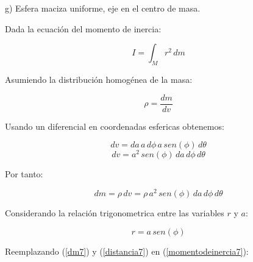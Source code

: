 \documentclass[letter,11pt]{article}
\begin{document}
\newpage
g) Esfera maciza uniforme, eje en el centro de masa.

Dada la ecuación del momento de inercia:

\begin{equation}
    I = \int_{M} r^2\, dm
\label{momentodeinercia7}
\end{equation}

Asumiendo la distribución homogénea de la masa:

\begin{equation*}
    \rho = \frac{dm}{dv}
\end{equation*}

Usando un diferencial en coordenadas esfericas obtenemos:

\begin{equation*}
    dv = da\, a\, d\phi\, a\, sen (\phi)\, d\theta
\end{equation*}
\begin{equation*}
    dv = a^2\, sen (\phi)\, da\, d\phi\, d\theta
\end{equation*}

Por tanto:

\begin{equation}
    dm = \rho\, dv = \rho\, a^2\, sen (\phi)\, da\, d\phi\, d\theta
\label{dm7}
\end{equation}

Considerando la relación trigonometrica entre las variables $r$ y $a$:

\begin{equation}
    r = a\, sen (\phi)
\label{distancia7}
\end{equation}

Reemplazando (\ref{dm7}) y (\ref{distancia7}) en (\ref{momentodeinercia7}): 
\end{document}
